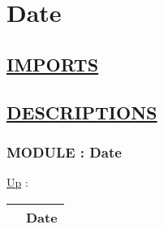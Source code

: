 \chapter*{Date}
\hypertarget{ecldoc:toc:Date}{}

\section*{\underline{IMPORTS}}
\begin{itemize}
\end{itemize}

\section*{\underline{DESCRIPTIONS}}
\subsection*{MODULE : Date}
\hypertarget{ecldoc:Date}{}
\hyperlink{ecldoc:toc:root}{Up} :

{\renewcommand{\arraystretch}{1.5}
\begin{tabularx}{\textwidth}{|>{\raggedright\arraybackslash}l|X|}
\hline
\hspace{0pt} & Date \\
\hline
\end{tabularx}
}

\par


